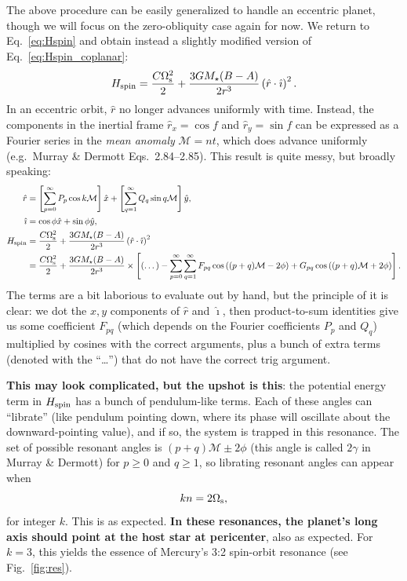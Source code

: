 \documentclass[11pt,
        usenames, %
        dvipsnames %
    ]{article}
\newcommand*{\p}[1]{\left(#1\right)}
\newcommand*{\s}[1]{\left[#1\right]}
\begin{document}
The above procedure can be easily generalized to handle an eccentric planet,
though we will focus on the zero-obliquity case again for now. We return to
Eq.~\eqref{eq:Hspin} and obtain instead a slightly modified version of
Eq.~\eqref{eq:Hspin_coplanar}:
\begin{equation}
    H_{\rm spin}
        = \frac{C\Omega_{\rm s}^2}{2} + \frac{3GM_\star(B - A)}{2r^3}
            \p{\hat{r} \cdot \hat{\imath}}^2.
\end{equation}
In an eccentric orbit, $\hat{r}$ no longer advances uniformly with time.
Instead, the components in the inertial frame $\hat{r}_x = \cos f$ and
$\hat{r}_y = \sin f$ can be expressed as a Fourier series in the
\emph{mean anomaly} $\mathcal{M} = nt$, which does advance uniformly (e.g.\ Murray \&
Dermott Eqs.~2.84--2.85). This result is quite messy, but broadly speaking:
\begin{align}
    \hat{r} &= \s{\sum\limits_{p=0}^\infty P_p \cos k\mathcal{M}} \hat{x}
        + \s{\sum\limits_{q=1}^\infty Q_q \sin q\mathcal{M}} \hat{y},\\
    \hat{\imath} &= \cos \phi \hat{x} + \sin \phi \hat{y},\\
    H_{\rm spin}
        &= \frac{C\Omega_{\rm s}^2}{2} + \frac{3GM_\star(B - A)}{2r^3}
            \p{\hat{r} \cdot \hat{\imath}}^2\nonumber\\
        &= \frac{C\Omega_{\rm s}^2}{2} + \frac{3GM_\star(B - A)}{2r^3}
            \times \s{(\dots) - \sum\limits_{p=0}^\infty
            \sum\limits_{q=1}^\infty
                F_{pq} \cos\p{(p + q)\mathcal{M} - 2\phi}
                + G_{pq} \cos\p{(p + q)\mathcal{M} + 2\phi}}
                .\label{eq:H_spin_ecc}
\end{align}
The terms are a bit laborious to evaluate out by hand, but the principle of it
is clear: we dot the $x, y$ components of $\hat{r}$ and $\hat{\imath}$, then
product-to-sum identities give us some coefficient $F_{pq}$ (which depends on
the Fourier coefficients $P_p$ and $Q_q$) multiplied by cosines with the correct
arguments, plus a bunch of extra terms (denoted with the ``\dots'') that do not
have the correct trig argument.

\textbf{This may look complicated, but the upshot is this}: the potential energy
term in $H_{\rm spin}$ has a bunch of pendulum-like terms. Each of these angles
can ``librate'' (like pendulum pointing down, where its phase will oscillate
about the downward-pointing value), and if so, the system is trapped in this
resonance. The set of possible resonant angles is $(p+q)\mathcal{M} \pm 2\phi$
(this angle is called $2\gamma$ in Murray \& Dermott) for $p \geq 0$ and $q \geq
1$, so librating resonant angles can appear when
\begin{equation}
    kn = 2\Omega_{\rm s},
\end{equation}
for integer $k$. This is as expected. \textbf{In these resonances, the planet's
long axis should point at the host star at pericenter}, also as expected. For $k
= 3$, this yields the essence of Mercury's 3:2 spin-orbit resonance (see
Fig.~\ref{fig:res}).
\end{document}
